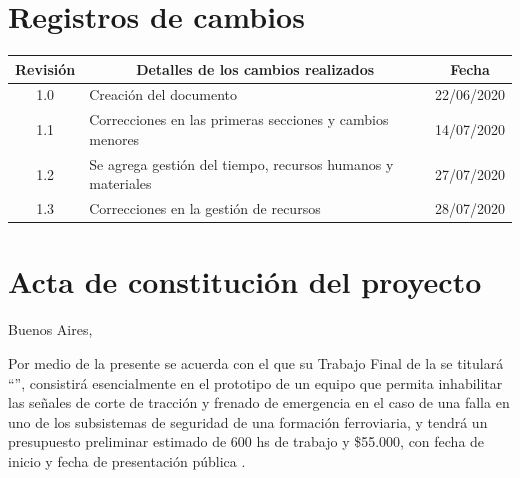 \documentclass[11pt]{charter}
\begin{document}
\maketitle
\thispagestyle{empty}
\pagebreak


\thispagestyle{empty}
{\setlength{\parskip}{0pt}
\tableofcontents{}
}
\pagebreak


\section{Registros de cambios}
\label{sec:registro}


\begin{table}[ht]
\label{tab:registro}
\centering

\begin{tabularx}{\linewidth}{@{}|c|X|c|@{}}
\hline
\rowcolor[HTML]{C0C0C0} 
Revisión & \multicolumn{1}{c|}{\cellcolor[HTML]{C0C0C0}Detalles de los cambios realizados} & Fecha      \\ \hline
1.0      & Creación del documento                                                          & 22/06/2020 \\ \hline
1.1      & Correcciones en las primeras secciones y cambios menores                        & 14/07/2020 \\ \hline
1.2      & Se agrega gestión del tiempo, recursos humanos y materiales                     & 27/07/2020 \\ \hline
1.3      & Correcciones en la gestión de recursos                                          & 28/07/2020 \\ \hline
\end{tabularx}
\end{table}

\pagebreak

\section{Acta de constitución del proyecto}
\label{sec:acta}

\begin{flushright}
Buenos Aires, \fechaInicioName
\end{flushright}

\vspace{2cm}

Por medio de la presente se acuerda con el \authorname\hspace{1px} que su Trabajo Final de la \degreename\hspace{1px} 
se titulará ``\ttitle'', consistirá esencialmente en el prototipo de un equipo que permita inhabilitar las señales de 
corte de tracción y frenado de emergencia en el caso de una falla en uno de los subsistemas de seguridad de una 
formación ferroviaria, y tendrá un presupuesto preliminar estimado de 600 hs de trabajo y \$55.000, con 
fecha de inicio \fechaInicioName\hspace{1px} y fecha de presentación pública \fechaFinalName.
\end{document}
